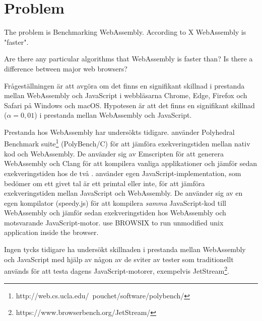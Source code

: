 \section{Problem}

The problem is Benchmarking WebAssembly. According to X WebAssembly is "faster". 

Are there any particular algorithms that WebAssembly is faster than?
Is there a difference between major web browsers?


Frågeställningen är att avgöra om det finns en signifikant skillnad i prestanda mellan WebAssembly och JavaScript i webbläsarna Chrome, Edge, Firefox och Safari på Windows och macOS. Hypotesen är att det finns en signifikant skillnad ($\alpha = 0,01$) i prestanda mellan WebAssembly och JavaScript.

Prestanda hos WebAssembly har undersökts tidigare. \textcite{HaasRossbergSchuffTitzerHolmanGohmanWagnerZakaiBastien2017} använder Polyhedral Benchmark suite\footnote{http://web.cs.ucla.edu/~pouchet/software/polybench/} (PolyBench/C) för att jämföra exekveringstiden mellan nativ kod och WebAssembly. De använder sig av Emscripten för att generera WebAssembly och Clang \parencite{LattnerAdve2014} för att kompilera vanliga applikationer och jämför sedan exekveringstiden hos de två \parencite{HaasRossbergSchuffTitzerHolmanGohmanWagnerZakaiBastien2017}. \textcite{ReiserBlaser2017} använder egen JavaScript-implementation, som bedömer om ett givet tal är ett primtal eller inte, för att jämföra exekveringstiden mellan JavaScript och WebAssembly. De använder sig av en egen kompilator (speedy.js) för att kompilera \emph{samma} JavaScript-kod till WebAssembly och jämför sedan exekveringstiden hos WebAssembly och motsvarande JavaScript-motor. \textcite{JangdaPowersGuhaBerger2019} use BROWSIX to run unmodified unix application inside the browser.

Ingen tycks tidigare ha undersökt skillnaden i prestanda mellan WebAssembly och JavaScript med hjälp av någon av de sviter av tester som traditionellt används för att testa dagens JavaScript-motorer, exempelvis JetStream\footnote{https://www.browserbench.org/JetStream/}.
